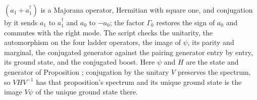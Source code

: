 $(a_{1} + a^{\dagger}_{1})$ is a Majorana operator, Hermitian with square one, and conjugation by it sends $a_{1}$ to $a^{\dagger}_{1}$ and $a_{0}$ to $-a_{0}$; the factor $\Gamma_{0}$ restores the sign of $a_{0}$ and commutes with the right mode. The script checks the unitarity, the automorphism on the four ladder operators, the image of $\psi$, its parity and marginal, the conjugated generator against the pairing generator entry by entry, its ground state, and the conjugated boost. Here $\psi$ and $H$ are the state and generator of Proposition ; conjugation by the unitary $V$ preserves the spectrum, so $VHV^{-1}$ has that proposition's spectrum and its unique ground state is the image $V\psi$ of the unique ground state there.
